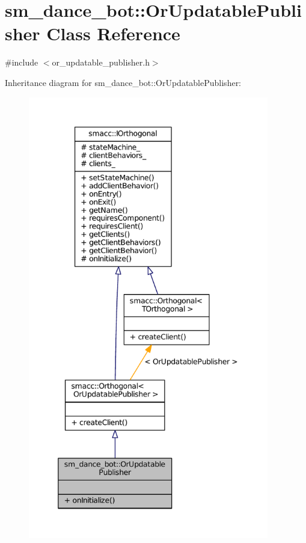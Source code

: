\hypertarget{classsm__dance__bot_1_1OrUpdatablePublisher}{}\section{sm\+\_\+dance\+\_\+bot\+:\+:Or\+Updatable\+Publisher Class Reference}
\label{classsm__dance__bot_1_1OrUpdatablePublisher}


{\ttfamily \#include $<$or\+\_\+updatable\+\_\+publisher.\+h$>$}



Inheritance diagram for sm\+\_\+dance\+\_\+bot\+:\+:Or\+Updatable\+Publisher\+:
\nopagebreak
\begin{figure}[H]
\begin{center}
\leavevmode
\includegraphics[height=550pt]{classsm__dance__bot_1_1OrUpdatablePublisher__inherit__graph}
\end{center}
\end{figure}


